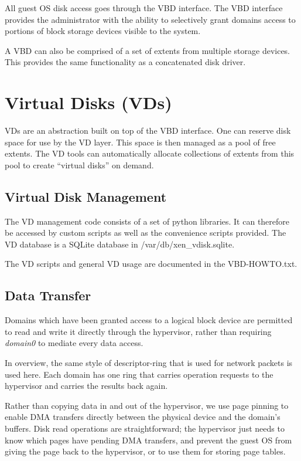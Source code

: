 \documentclass[11pt,twoside,final,openright]{xenstyle}
\begin{document}
All guest OS disk access goes through the VBD interface. The VBD interface
provides the administrator with the ability to selectively grant domains 
access to portions of block storage devices visible to the system.

A VBD can also be comprised of a set of extents from multiple storage devices.
This provides the same functionality as a concatenated disk driver.

\section{Virtual Disks (VDs)}

VDs are an abstraction built on top of the VBD interface. One can reserve disk
space for use by the VD layer. This space is then managed as a pool of free extents.
The VD tools can automatically allocate collections of extents from this pool to
create ``virtual disks'' on demand. 

\subsection{Virtual Disk Management}
The VD management code consists of a set of python libraries. It can therefore
be accessed by custom scripts as well as the convenience scripts provided. The
VD database is a SQLite database in /var/db/xen\_vdisk.sqlite.

The VD scripts and general VD usage are documented in the VBD-HOWTO.txt.

\subsection{Data Transfer}
Domains which have been granted access to a logical block device are permitted
to read and write it directly through the hypervisor, rather than requiring
{\it domain0} to mediate every data access. 

In overview, the same style of descriptor-ring that is used for network
packets is used here. Each domain has one ring that carries operation requests to the 
hypervisor and carries the results back again. 

Rather than copying data in and out of the hypervisor, we use page pinning to
enable DMA transfers directly between the physical device and the domain's 
buffers. Disk read operations are straightforward; the hypervisor just needs
to know which pages have pending DMA transfers, and prevent the guest OS from
giving the page back to the hypervisor, or to use them for storing page tables.
\end{document}
